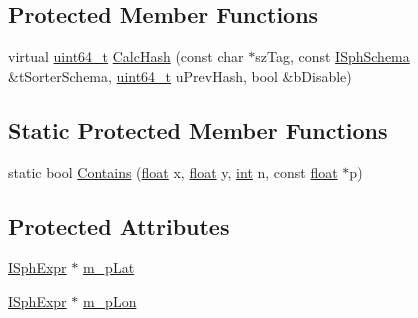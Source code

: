 \subsection*{Protected Member Functions}
\begin{DoxyCompactItemize}
\item 
virtual \hyperlink{sphinxstd_8h_aaa5d1cd013383c889537491c3cfd9aad}{uint64\-\_\-t} \hyperlink{classExpr__Contains__c_aa4df0362efd94e9ca996615384fabf61}{Calc\-Hash} (const char $\ast$sz\-Tag, const \hyperlink{classISphSchema}{I\-Sph\-Schema} \&t\-Sorter\-Schema, \hyperlink{sphinxstd_8h_aaa5d1cd013383c889537491c3cfd9aad}{uint64\-\_\-t} u\-Prev\-Hash, bool \&b\-Disable)
\end{DoxyCompactItemize}
\subsection*{Static Protected Member Functions}
\begin{DoxyCompactItemize}
\item 
static bool \hyperlink{classExpr__Contains__c_a592cb81b7b7fc42e91d0ef5e9e507b73}{Contains} (\hyperlink{sphinxexpr_8cpp_a0e0d0739f7035f18f949c2db2c6759ec}{float} x, \hyperlink{sphinxexpr_8cpp_a0e0d0739f7035f18f949c2db2c6759ec}{float} y, \hyperlink{sphinxexpr_8cpp_a4a26e8f9cb8b736e0c4cbf4d16de985e}{int} n, const \hyperlink{sphinxexpr_8cpp_a0e0d0739f7035f18f949c2db2c6759ec}{float} $\ast$p)
\end{DoxyCompactItemize}
\subsection*{Protected Attributes}
\begin{DoxyCompactItemize}
\item 
\hyperlink{structISphExpr}{I\-Sph\-Expr} $\ast$ \hyperlink{classExpr__Contains__c_a47ab509cf08dcc4b3d18cffee43555e5}{m\-\_\-p\-Lat}
\item 
\hyperlink{structISphExpr}{I\-Sph\-Expr} $\ast$ \hyperlink{classExpr__Contains__c_a463a16d8a76fb7b8735c72c91c1f1279}{m\-\_\-p\-Lon}
\end{DoxyCompactItemize}


